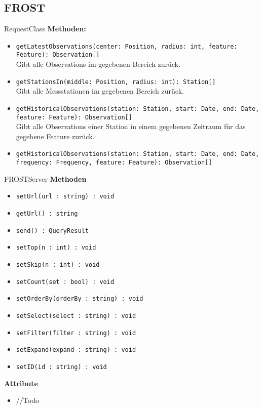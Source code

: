 \subsection{FROST}

\begin{Class}{RequestClass}
    \textbf{Methoden:}
    \begin{itemize}
        \item \texttt{getLatestObservations(center: Position, radius: int, feature: Feature): Observation[]}
        \\Gibt alle Observations im gegebenen Bereich zurück.
        \item \texttt{getStationsIn(middle: Position, radius: int): Station[]}
        \\Gibt alle Messstationen im gegebenen Bereich zurück.
        \item \texttt{getHistoricalObservations(station: Station, start: Date, end: Date, feature: Feature): Observation[]}
        \\Gibt alle Observations einer Station in einem gegebenen Zeitraum für das gegebene Feature zurück.
        \item \texttt{getHistoricalObservations(station: Station, start: Date, end: Date, frequency: Frequency, feature: Feature): Observation[]}
        
    \end{itemize}
\end{Class}

\begin{Class}{FROSTServer}
    \textbf{Methoden}
    \begin{itemize}
        \item \texttt{setUrl(url : string) : void}
        \item \texttt{getUrl() : string}
        \item \texttt{send() : QueryResult}
        \item \texttt{setTop(n : int) : void   }
        \item \texttt{setSkip(n : int) : void}
        \item \texttt{setCount(set : bool) : void}
        \item \texttt{setOrderBy(orderBy : string) : void}
        \item \texttt{setSelect(select : string) : void}
        \item \texttt{setFilter(filter : string) : void}
        \item \texttt{setExpand(expand : string) : void}
        \item \texttt{setID(id : string) : void}
    \end{itemize}
    
    \textbf{Attribute}
    \begin{itemize}
        \item //Todo
    \end{itemize}
\end{Class}

